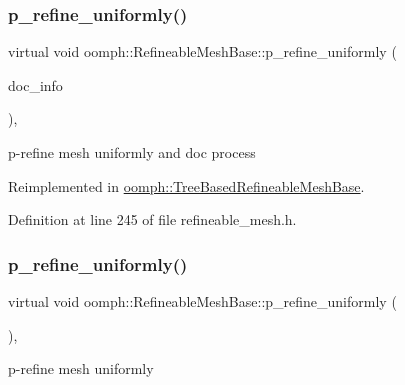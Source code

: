 \subsubsection{\texorpdfstring{p\+\_\+refine\+\_\+uniformly()}{p\_refine\_uniformly()}\hspace{0.1cm}{\footnotesize\ttfamily [1/2]}}
{\footnotesize\ttfamily virtual void oomph\+::\+Refineable\+Mesh\+Base\+::p\+\_\+refine\+\_\+uniformly (\begin{DoxyParamCaption}\item[{\hyperlink{classoomph_1_1DocInfo}{Doc\+Info} \&}]{doc\+\_\+info }\end{DoxyParamCaption})\hspace{0.3cm}{\ttfamily [inline]}, {\ttfamily [virtual]}}



p-\/refine mesh uniformly and doc process 



Reimplemented in \hyperlink{classoomph_1_1TreeBasedRefineableMeshBase_a270d74e0e30f9956c85e4cdcc202c98b}{oomph\+::\+Tree\+Based\+Refineable\+Mesh\+Base}.



Definition at line 245 of file refineable\+\_\+mesh.\+h.

\mbox{\label{classoomph_1_1RefineableMeshBase_a648a6fd1b186baf1b01c07b879280480}} 
\subsubsection{\texorpdfstring{p\+\_\+refine\+\_\+uniformly()}{p\_refine\_uniformly()}\hspace{0.1cm}{\footnotesize\ttfamily [2/2]}}
{\footnotesize\ttfamily virtual void oomph\+::\+Refineable\+Mesh\+Base\+::p\+\_\+refine\+\_\+uniformly (\begin{DoxyParamCaption}{ }\end{DoxyParamCaption})\hspace{0.3cm}{\ttfamily [inline]}, {\ttfamily [virtual]}}



p-\/refine mesh uniformly 



